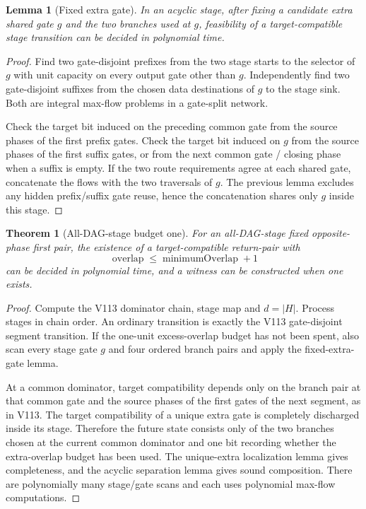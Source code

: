 \documentclass[11pt]{article}
\newtheorem{theorem}{Theorem}
\newtheorem{lemma}{Lemma}
\begin{document}
\begin{lemma}[Fixed extra gate]
In an acyclic stage, after fixing a candidate extra shared gate $g$ and the two branches used at $g$, feasibility of a target-compatible stage transition can be decided in polynomial time.
\end{lemma}
\begin{proof}
Find two gate-disjoint prefixes from the two stage starts to the selector of $g$ with unit capacity on every output gate other than $g$.  Independently find two gate-disjoint suffixes from the chosen data destinations of $g$ to the stage sink.  Both are integral max-flow problems in a gate-split network.

Check the target bit induced on the preceding common gate from the source phases of the first prefix gates.  Check the target bit induced on $g$ from the source phases of the first suffix gates, or from the next common gate / closing phase when a suffix is empty.  If the two route requirements agree at each shared gate, concatenate the flows with the two traversals of $g$.  The previous lemma excludes any hidden prefix/suffix gate reuse, hence the concatenation shares only $g$ inside this stage.
\end{proof}

\begin{theorem}[All-DAG-stage budget one]
For an all-DAG-stage fixed opposite-phase first pair, the existence of a target-compatible return-pair with
\[
\operatorname{overlap}\leq \operatorname{minimumOverlap}+1
\]
can be decided in polynomial time, and a witness can be constructed when one exists.
\end{theorem}
\begin{proof}
Compute the V113 dominator chain, stage map and $d=|H|$.  Process stages in chain order.  An ordinary transition is exactly the V113 gate-disjoint segment transition.  If the one-unit excess-overlap budget has not been spent, also scan every stage gate $g$ and four ordered branch pairs and apply the fixed-extra-gate lemma.

At a common dominator, target compatibility depends only on the branch pair at that common gate and the source phases of the first gates of the next segment, as in V113.  The target compatibility of a unique extra gate is completely discharged inside its stage.  Therefore the future state consists only of the two branches chosen at the current common dominator and one bit recording whether the extra-overlap budget has been used.  The unique-extra localization lemma gives completeness, and the acyclic separation lemma gives sound composition.  There are polynomially many stage/gate scans and each uses polynomial max-flow computations.
\end{proof}
\end{document}
